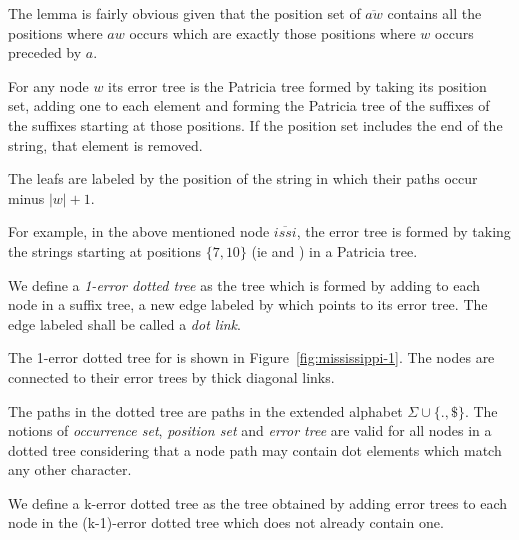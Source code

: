 The lemma is fairly obvious given that the position set of $\overline{aw}$ contains all the positions where $aw$ occurs which are exactly those positions where $w$ occurs preceded by $a$.

\begin{definition}
For any node $w$ its error tree is the Patricia tree formed by taking its position set, adding one to each element and forming the Patricia tree of the suffixes of the suffixes starting at those positions. If the position set includes the end of the string, that element is removed.

The leafs are labeled by the position of the string in which their paths occur minus $|w| + 1$.
\end{definition}

For example, in the above mentioned node $\overline{issi}$, the error tree is formed by taking the strings starting at positions $\{7, 10\}$ (ie  and ) in a Patricia tree.

\begin{definition}
We define a \emph{1-error dotted tree} as the tree which is formed by adding to each node in a suffix tree, a new edge labeled by  which points to its error tree. The edge labeled  shall be called a \emph{dot link}.
\end{definition}

The 1-error dotted tree for  is shown in Figure~\ref{fig:mississippi-1}. The nodes are connected to their error trees by thick diagonal links.

The paths in the dotted tree are paths in the extended alphabet $\Sigma\cup\{.,\$\}$. The notions of \emph{occurrence set}, \emph{position set} and \emph{error tree} are valid for all nodes in a dotted tree considering that a node path may contain dot elements which match any other character.

\begin{definition}
We define a k-error dotted tree as the tree obtained by adding error trees to each node in the (k-1)-error dotted tree which does not already contain one.
\end{definition}

